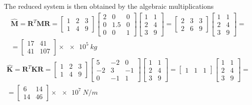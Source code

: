 \begin{Answer}[ref={three_storey}]
The reduced system is then obtained by the algebraic multiplications
\begin{multline*}
\hat{\mathbf{M}} = \mathbf{R}^T \mathbf{M} \mathbf{R} =
\begin{bmatrix}
    1 & 2 & 3 \\
    1 & 4 & 9
\end{bmatrix}
\begin{bmatrix}
    2 & 0 & 0 \\
    0 & 1.5 & 0 \\
    0 & 0 & 1
\end{bmatrix}
\begin{bmatrix}
    1 & 1 \\
    2 & 4 \\
    3 & 9
\end{bmatrix} =
\begin{bmatrix}
    2 & 3 & 3 \\
    2 & 6 & 9
\end{bmatrix}
\begin{bmatrix}
    1 & 1 \\
    2 & 4 \\
    3 & 9
\end{bmatrix} = \\
= \begin{bmatrix}
    17 & 41 \\
    41 & 107
\end{bmatrix} \times \SI{e5}{kg}
\end{multline*}
\begin{multline*}
\hat{\mathbf{K}} = \mathbf{R}^T \mathbf{K} \mathbf{R} =
\begin{bmatrix}
    1 & 2 & 3 \\
    1 & 4 & 9
\end{bmatrix}
\begin{bmatrix}
    5 & -2 & 0 \\
    -2 & 3 & -1 \\
    0 & -1 & 1
\end{bmatrix}
\begin{bmatrix}
    1 & 1 \\
    2 & 4 \\
    3 & 9
\end{bmatrix} =
\begin{bmatrix}
    1 & 1 & 1
\end{bmatrix}
\begin{bmatrix}
    1 & 1 \\
    2 & 4 \\
    3 & 9
\end{bmatrix} = \\
= \begin{bmatrix}
    6 & 14 \\
    14 & 46
\end{bmatrix} \times \SI{e7}{N/m}
\end{multline*}


\end{Answer}
